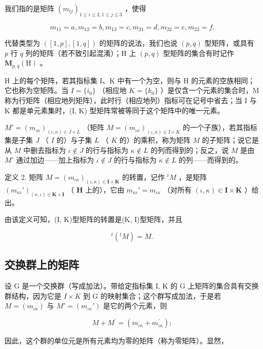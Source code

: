 我们指的是矩阵 \((m_{ij})_{1\leqslant i\leqslant 2,1\leqslant j\leqslant 3}\) ，使得

\[
m _ {1 1} = a, m _ {1 2} = b, m _ {1 3} = c, m _ {2 1} = d, m _ {2 2} = e, m _ {2 3} = f.
\]

代替类型为 \(([1, p], [1, q])\) 的矩阵的说法，我们也说 \((p, q)\) 型矩阵，或具有 \(p\) 行 \(q\) 列的矩阵（若不致引起混淆）；H 上 \((p, q)\) 型矩阵的集合有时记作 \(\mathbf{M}_{p,q}(\mathrm{H})\) 。

H 上的每个矩阵，若其指标集 I、K 中有一个为空，则与 H 的元素的空族相同；它也称为空矩阵。当 \(I = \{i_{0}\}\) （相应地 \(K = \{k_{0}\}\) ）是仅含一个元素的集合时，M 称为行矩阵（相应地列矩阵），此时行（相应地列）指标可在记号中省去；当 I 与 K 都是单元素集时，(I, K) 型矩阵常被等同于这个矩阵中的唯一元素。

\(M' = (m_{\iota \kappa})_{(\iota, \kappa) \in J \times L}\) （矩阵 \(M = (m_{\iota \kappa})_{(\iota, \kappa) \in I \times K}\) 的一个子族），若其指标集是子集 \(J\) （ \(I\) 的）与子集 \(L\) （ \(K\) 的）的乘积，称为矩阵 \(M\) 的子矩阵；说它是从 \(M\) 中删去指标为 \(\iota \notin J\) 的行与指标为 \(\kappa \notin L\) 的列而得到的；反之，说 \(M\) 是由 \(M'\) 通过加边——加上指标为 \(\iota \notin J\) 的行与指标为 \(\kappa \notin L\) 的列——而得到的。

定义 2. 矩阵 \(M = (m_{\iota \kappa})_{(\iota, \kappa) \in \mathbf{I} \times \mathbf{K}}\) 的转置，记作 \({}^tM\) ，是矩阵 \((m_{\kappa \iota}')_{(\kappa, \iota) \in \mathbf{K} \times \mathbf{I}}\) （ \(\mathbf{H}\) 上的），它由 \(m_{\kappa \iota}' = m_{\iota \kappa}\) （对所有 \((\iota, \kappa) \in \mathbf{I} \times \mathbf{K}\) ）给出。

由该定义可知，(I, K)型矩阵的转置是(K, I)型矩阵，并且

\[
{ } ^ { t } ( { } ^ { t } M ) = M .\tag{1}
\]

\subsection{交换群上的矩阵}

设 G 是一个交换群（写成加法）。带给定指标集 I, K 的 G 上矩阵的集合具有交换群结构，因为它是 \(I \times K\) 到 G 的映射集合；这个群写成加法，于是若 \(M = (m_{\iota\kappa})\) 与 \(M' = (m_{\iota\kappa}')\) 是它的两个元素，则

\[
M + M ^ {\prime} = (m _ {\iota \kappa} + m _ {\iota \kappa} ^ {\prime});
\]

因此，这个群的单位元是所有元素均为零的矩阵（称为零矩阵）。显然，

